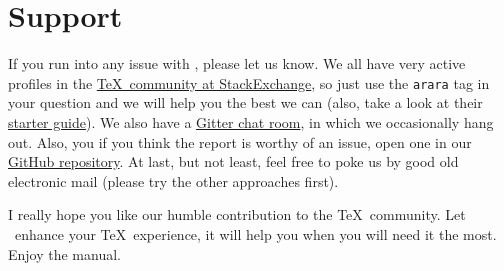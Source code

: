 \section{Support}
\label{sec:support}

If you run into any issue with \arara, please let us know. We all have very active profiles in the \href{https://tex.stackexchange.com/}{\TeX\ community at StackExchange}, so just use the \verb|arara| tag in your question and we will help you the best we can (also, take a look at their \href{https://tex.meta.stackexchange.com/q/1436}{starter guide}).  We also have a \href{https://gitter.im/cereda/arara}{Gitter chat room}, in which we occasionally hang out. Also, you if you think the report is worthy of an issue, open one in our \href{https://github.com/cereda/arara/issues}{GitHub repository}. At last, but not least, feel free to poke us by good old electronic mail (please try the other approaches first).

I really hope you like our humble contribution to the \TeX\ community. Let \arara\ enhance your \TeX\ experience, it will help you when you will need it the most. Enjoy the manual.
